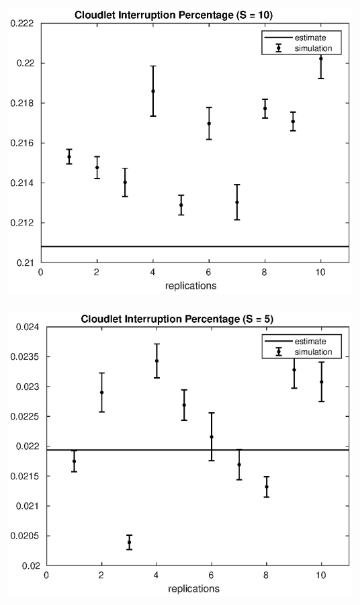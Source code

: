 \begin{frame}
\begin{figure}[!h]
\begin{subfigure}[t]{0.49\textwidth}
\label{15_intperc}
\end{subfigure}
%
\begin{subfigure}[t]{0.49\textwidth}
\includegraphics[width=\textwidth]{../figures/simul/10_500K_intperc}
\label{10_intperc}
\end{subfigure}
%
\begin{subfigure}[t]{0.49\textwidth}
\includegraphics[width=\textwidth]{../figures/simul/5_500K_intperc}
\label{5_intperc}
\end{subfigure}
%
\label{plot:intperc}
\end{figure}

\end{frame}
